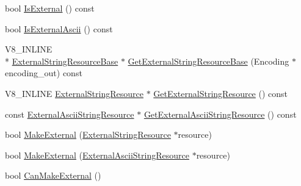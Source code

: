 \begin{DoxyCompactItemize}
\item 
bool \hyperlink{classv8_1_1String_abbf623aabba9446cd57af14018877398}{Is\-External} () const 
\item 
bool \hyperlink{classv8_1_1String_a470adeefeeb419860d4e069714fed42e}{Is\-External\-Ascii} () const 
\item 
V8\-\_\-\-I\-N\-L\-I\-N\-E \\*
\hyperlink{classv8_1_1String_1_1ExternalStringResourceBase}{External\-String\-Resource\-Base} $\ast$ \hyperlink{classv8_1_1String_a471cf0e3ca135d839e59d25da66894e0}{Get\-External\-String\-Resource\-Base} (Encoding $\ast$encoding\-\_\-out) const 
\item 
V8\-\_\-\-I\-N\-L\-I\-N\-E \hyperlink{classv8_1_1String_1_1ExternalStringResource}{External\-String\-Resource} $\ast$ \hyperlink{classv8_1_1String_a1a78c6fe39dbdd6322ca576e224f0cba}{Get\-External\-String\-Resource} () const 
\item 
const \hyperlink{classv8_1_1String_1_1ExternalAsciiStringResource}{External\-Ascii\-String\-Resource} $\ast$ \hyperlink{classv8_1_1String_a1e6b2d33868b12e3b8fc4553b8b11d24}{Get\-External\-Ascii\-String\-Resource} () const 
\item 
bool \hyperlink{classv8_1_1String_a5efd1eba40c1fa8a6aae2c4a175a63be}{Make\-External} (\hyperlink{classv8_1_1String_1_1ExternalStringResource}{External\-String\-Resource} $\ast$resource)
\item 
bool \hyperlink{classv8_1_1String_a19db11c97e2ce01244e06f5cbcd094f2}{Make\-External} (\hyperlink{classv8_1_1String_1_1ExternalAsciiStringResource}{External\-Ascii\-String\-Resource} $\ast$resource)
\item 
bool \hyperlink{classv8_1_1String_a0fe076838af046506ffebbfadcde812a}{Can\-Make\-External} ()
\end{DoxyCompactItemize}
